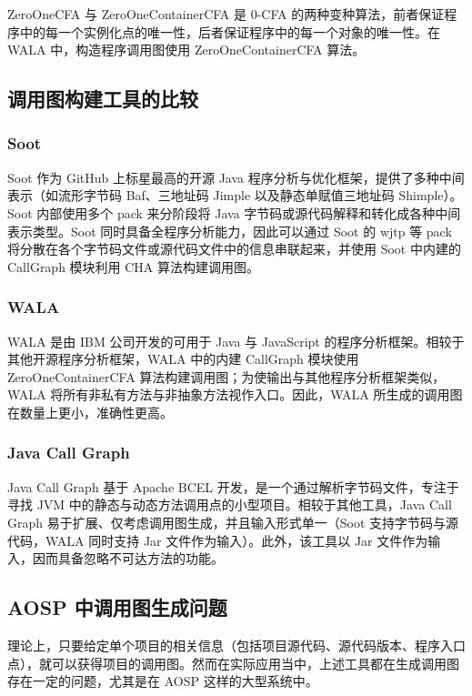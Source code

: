 ZeroOneCFA 与 ZeroOneContainerCFA 是 0-CFA 的两种变种算法，前者保证程序中的每一个实例化点的唯一性，后者保证程序中的每一个对象的唯一性。在 WALA 中，构造程序调用图使用 ZeroOneContainerCFA 算法\cite{AHybridSoftwareChangeImpactAnalysis}。

\subsection{调用图构建工具的比较}

\subsubsection{Soot}

Soot 作为 GitHub 上标星最高的开源 Java 程序分析与优化框架，提供了多种中间表示（如流形字节码 Baf、三地址码 Jimple 以及静态单赋值三地址码 Shimple）。Soot 内部使用多个 pack 来分阶段将 Java 字节码或源代码解释和转化成各种中间表示类型。Soot 同时具备全程序分析能力，因此可以通过 Soot 的 wjtp 等 pack 将分散在各个字节码文件或源代码文件中的信息串联起来，并使用 Soot 中内建的 CallGraph 模块利用 CHA 算法构建调用图。

\subsubsection{WALA}

WALA 是由 IBM 公司开发的可用于 Java 与 JavaScript 的程序分析框架。相较于其他开源程序分析框架，WALA 中的内建 CallGraph 模块使用 ZeroOneContainerCFA 算法构建调用图；为使输出与其他程序分析框架类似，WALA 将所有非私有方法与非抽象方法视作入口。因此，WALA 所生成的调用图在数量上更小，准确性更高。

\subsubsection{Java Call Graph}

Java Call Graph 基于 Apache BCEL 开发，是一个通过解析字节码文件，专注于寻找 JVM 中的静态与动态方法调用点的小型项目。相较于其他工具，Java Call Graph 易于扩展、仅考虑调用图生成，并且输入形式单一（Soot 支持字节码与源代码，WALA 同时支持 Jar 文件作为输入）。此外，该工具以 Jar 文件作为输入，因而具备忽略不可达方法的功能。

\subsection{AOSP 中调用图生成问题}

理论上，只要给定单个项目的相关信息（包括项目源代码、源代码版本、程序入口点），就可以获得项目的调用图。然而在实际应用当中，上述工具都在生成调用图存在一定的问题，尤其是在 AOSP 这样的大型系统中。


